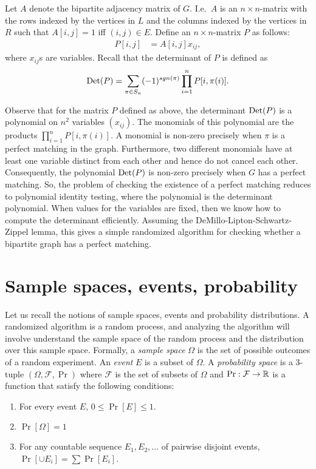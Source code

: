Let $A$ denote the bipartite adjacency matrix of $G$. I.e.\ $A$ is an
$n\times n$-matrix with the rows indexed by the vertices in $L$ and the columns
indexed by the vertices in $R$ such that $A[i,j] = 1$ iff $(i,j)\in E$. Define
an $n\times n$-matrix $P$ as follows:
\begin{align*}
	P[i,j] &= A[i,j]x_{ij},
\end{align*}
where $x_{ij}$s are variables. Recall that the determinant of $P$ is defined as
\begin{align*}
	\operatorname{Det}(P) = \sum_{\pi \in S_n} (-1)^{sgn(\pi)} \prod_{i=1}^n P[i,\pi(i)].
\end{align*}

Observe that for the matrix $P$ defined as above, the determinant $\operatorname{Det}(P)$ is a
polynomial on $n^2$ variables $(x_{ij})$. The monomials of this polynomial are
the products $\prod_{i=1}^n P[i,\pi(i)]$. A monomial is non-zero precisely when
$\pi$ is a perfect matching in the graph. Furthermore, two different monomials
have at least one variable distinct from each other and hence do not cancel each
other. Consequently, the polynomial $\operatorname{Det}(P)$ is non-zero precisely when $G$ has
a perfect matching. So, the problem of checking the existence of a perfect
matching reduces to polynomial identity testing, where the polynomial is the
determinant polynomial. When values for the variables are fixed, then we know
how to compute the determinant efficiently. Assuming the
DeMillo-Lipton-Schwartz-Zippel lemma, this gives a simple randomized algorithm
for checking whether a bipartite graph has a perfect matching.
\section{Sample spaces, events, probability}

Let us recall the notions of sample spaces, events and probability distributions. A randomized algorithm is a random process, and analyzing the algorithm will involve understand the sample space of the random process and the distribution over this sample space. Formally, a \textit{sample space} $\Omega$ is the set of possible outcomes of a random experiment. An \textit{event} $E$ is a subset of $\Omega$. A \textit{probability space} is a $3$-tuple $(\Omega, \mathcal{F},\Pr)$ where $\mathcal{F}$ is the set of subsets of $\Omega$ and $\Pr:\mathcal{F} \to \mathbb{R}$ is a function that satisfy the following conditions:
\begin{enumerate}
	\item For every event $E$, $0 \leq \Pr[E] \leq 1$.
	\item $\Pr[\Omega] = 1$
	\item For any countable sequence $E_1, E_2, \ldots $ of pairwise disjoint events, $\Pr[\cup E_i] = \sum \Pr[E_i]$.
\end{enumerate}

